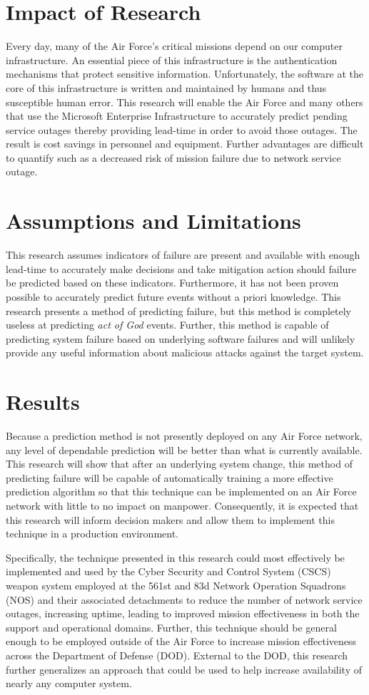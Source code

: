 \section{Impact of Research}
Every day, many of the Air Force's critical missions depend on our computer
infrastructure.  An essential piece of this infrastructure is the
authentication mechanisms that protect  sensitive information.
Unfortunately, the software at the core of this infrastructure is written and
maintained by humans and thus susceptible human error.  This research will
enable the Air Force and many others that use the Microsoft Enterprise
Infrastructure to accurately predict pending service outages thereby providing
lead-time in order to avoid those outages.  The result is cost savings in
personnel and equipment.  Further advantages are difficult to quantify such as
a decreased risk of mission failure due to network service outage.

\section{Assumptions and Limitations}
This research assumes indicators of failure are present and available with
enough lead-time to accurately make decisions and take mitigation action should
failure be predicted based on these indicators.  Furthermore, it has not been
proven possible to accurately predict future events without a priori knowledge.
This research presents a method of predicting failure, but this method is
completely useless at predicting \emph{act of God} events.  Further, this
method is capable of predicting system failure based on underlying software
failures and will unlikely provide any useful information about malicious
attacks against the target system.

\section{Results}
Because a prediction method is not presently deployed on any Air Force network,
any level of dependable prediction will be better than what is currently
available.  This research will show that after an underlying system change,
this method of predicting failure will be capable of automatically training a
more effective prediction algorithm so that this technique can be implemented
on an Air Force network with little to no impact on manpower.  Consequently, it
is expected that this research will inform decision makers and allow them to
implement this technique in a production environment.

Specifically, the technique presented in this research could most effectively
be implemented and used by the Cyber Security and Control System (CSCS) weapon
system employed at the 561st and 83d Network Operation Squadrons (NOS) and
their associated detachments to reduce the number of network service outages,
increasing uptime, leading to improved mission effectiveness in both the
support and operational domains.  Further, this technique should be general
enough to be employed outside of the Air Force to increase mission
effectiveness across the Department of Defense (DOD).  External to the DOD,
this research further generalizes an approach that could be used to help
increase availability of nearly any computer system.

